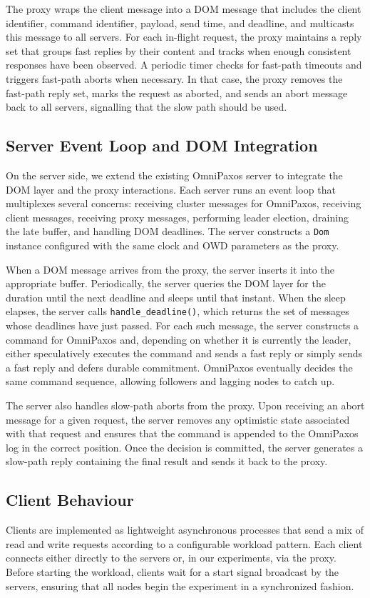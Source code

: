 \documentclass{article}
\begin{document}
The proxy wraps the client message into a DOM message that includes the client identifier, command identifier, payload, send time, and deadline, and multicasts this message to all servers. For each in-flight request, the proxy maintains a reply set that groups fast replies by their content and tracks when enough consistent responses have been observed. A periodic timer checks for fast-path timeouts and triggers fast-path aborts when necessary. In that case, the proxy removes the fast-path reply set, marks the request as aborted, and sends an abort message back to all servers, signalling that the slow path should be used.

\subsection{Server Event Loop and DOM Integration}
On the server side, we extend the existing OmniPaxos server to integrate the DOM layer and the proxy interactions. Each server runs an event loop that multiplexes several concerns: receiving cluster messages for OmniPaxos, receiving client messages, receiving proxy messages, performing leader election, draining the late buffer, and handling DOM deadlines. The server constructs a \texttt{Dom} instance configured with the same clock and OWD parameters as the proxy.

When a DOM message arrives from the proxy, the server inserts it into the appropriate buffer. Periodically, the server queries the DOM layer for the duration until the next deadline and sleeps until that instant. When the sleep elapses, the server calls \texttt{handle\_deadline()}, which returns the set of messages whose deadlines have just passed. For each such message, the server constructs a command for OmniPaxos and, depending on whether it is currently the leader, either speculatively executes the command and sends a fast reply or simply sends a fast reply and defers durable commitment. OmniPaxos eventually decides the same command sequence, allowing followers and lagging nodes to catch up.

The server also handles slow-path aborts from the proxy. Upon receiving an abort message for a given request, the server removes any optimistic state associated with that request and ensures that the command is appended to the OmniPaxos log in the correct position. Once the decision is committed, the server generates a slow-path reply containing the final result and sends it back to the proxy.

\subsection{Client Behaviour}
Clients are implemented as lightweight asynchronous processes that send a mix of read and write requests according to a configurable workload pattern. Each client connects either directly to the servers or, in our experiments, via the proxy. Before starting the workload, clients wait for a start signal broadcast by the servers, ensuring that all nodes begin the experiment in a synchronized fashion.
\end{document}
